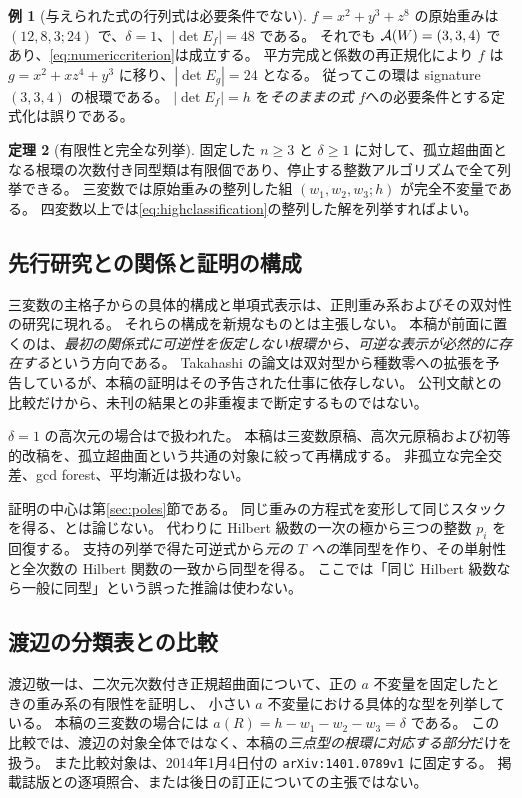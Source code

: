 \documentclass[11pt,a4paper]{ltjsarticle}
\numberwithin{equation}{section}
\theoremstyle{definition}
\newtheorem{theorem}{定理}[section]
\newtheorem{example}[theorem]{例}
\begin{document}
\begin{example}[与えられた式の行列式は必要条件でない]\label{ex:counterexample}
$f=x^2+y^3+z^8$ の原始重みは $(12,8,3;24)$ で、$\delta=1$、$|\det E_f|=48$ である。
それでも $\mathcal A(W)=(3,3,4)$ であり、\eqref{eq:numericcriterion}は成立する。
平方完成と係数の再正規化により $f$ は
$g=x^2+xz^4+y^3$ に移り、$|\det E_g|=24$ となる。
従ってこの環は signature $(3,3,4)$ の根環である。
$|\det E_f|=h$ を\emph{そのままの式 $f$}への必要条件とする定式化は誤りである。
\end{example}

\begin{theorem}[有限性と完全な列挙]\label{thm:finite}
固定した $n\ge3$ と $\delta\ge1$ に対して、孤立超曲面となる根環の次数付き同型類は有限個であり、停止する整数アルゴリズムで全て列挙できる。
三変数では原始重みの整列した組 $(w_1,w_2,w_3;h)$ が完全不変量である。
四変数以上では\eqref{eq:highclassification}の整列した解を列挙すればよい。
\end{theorem}

\subsection{先行研究との関係と証明の構成}
三変数の主格子からの具体的構成と単項式表示は、正則重み系およびその双対性の研究に現れる\cite{Takahashi,ET}。
それらの構成を新規なものとは主張しない。
本稿が前面に置くのは、\emph{最初の関係式に可逆性を仮定しない根環から、可逆な表示が必然的に存在する}という方向である。
Takahashi の論文は双対型から種数零への拡張を予告している\cite[Introduction]{Takahashi}が、本稿の証明はその予告された仕事に依存しない。
公刊文献との比較だけから、未刊の結果との非重複まで断定するものではない。

$\delta=1$ の高次元の場合は\cite{HLU}で扱われた。
本稿は三変数原稿\cite{v04}、高次元原稿\cite{higher}および初等的改稿\cite{v05}を、孤立超曲面という共通の対象に絞って再構成する。
非孤立な完全交差、gcd forest、平均漸近は扱わない。

証明の中心は第\ref{sec:poles}節である。
同じ重みの方程式を変形して同じスタックを得る、とは論じない。
代わりに Hilbert 級数の一次の極から三つの整数 $p_i$ を回復する。
支持の列挙で得た可逆式から\emph{元の $T$ への}準同型を作り、その単射性と全次数の Hilbert 関数の一致から同型を得る。
ここでは「同じ Hilbert 級数なら一般に同型」という誤った推論は使わない。


\subsection{渡辺の分類表との比較}\label{subsec:watanabe_intro}
渡辺敬一は、二次元次数付き正規超曲面について、正の $a$ 不変量を固定したときの重み系の有限性を証明し、
小さい $a$ 不変量における具体的な型を列挙している\cite[Theorem 2.1, Section 3]{WatanabeV1}。
本稿の三変数の場合には $a(R)=h-w_1-w_2-w_3=\delta$ である。
この比較では、渡辺の対象全体ではなく、本稿の\emph{三点型の根環に対応する部分}だけを扱う。
また比較対象は、2014年1月4日付の \texttt{arXiv:1401.0789v1} に固定する。
掲載誌版\cite{WatanabeJournal}との逐項照合、または後日の訂正についての主張ではない。
\end{document}
